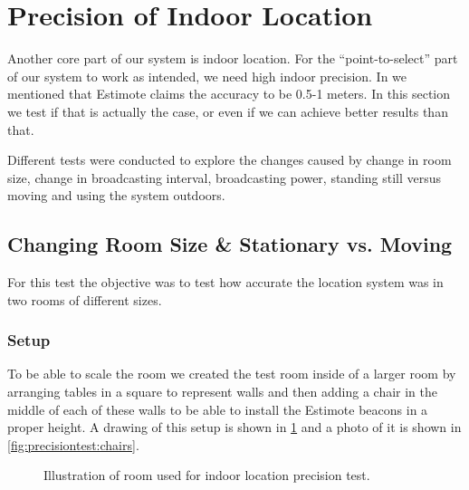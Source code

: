 \section{Precision of Indoor Location}\label{sec:estimoteprecision}
Another core part of our system is indoor location. 
For the ``point-to-select'' part of our system to work as intended, we need high indoor precision. 
In  we mentioned that Estimote claims the accuracy to be \num{0.5}-\num{1} meters.
In this section we test if that is actually the case, or even if we can achieve better results than that. 

Different tests were conducted to explore the changes caused by change in room size, change in broadcasting interval, broadcasting power, standing still versus moving and using the system outdoors.

\subsection{Changing Room Size \& Stationary vs. Moving}
For this test the objective was to test how accurate the location system was in two rooms of different sizes.

\subsubsection*{Setup}
To be able to scale the room we created the test room inside of a larger room by arranging tables in a square to represent walls and then adding a chair in the middle of each of these walls to be able to install the Estimote beacons in a proper height.
A drawing of this setup is shown in \cref{fig:precisiontest:illustration} and a photo of it is shown in \cref{fig:precisiontest:chairs}.

\begin{figure}[!htb]
    \centering
    \caption{Illustration of room used for indoor location precision test.}
\label{fig:precisiontest:illustration}
\end{figure}

